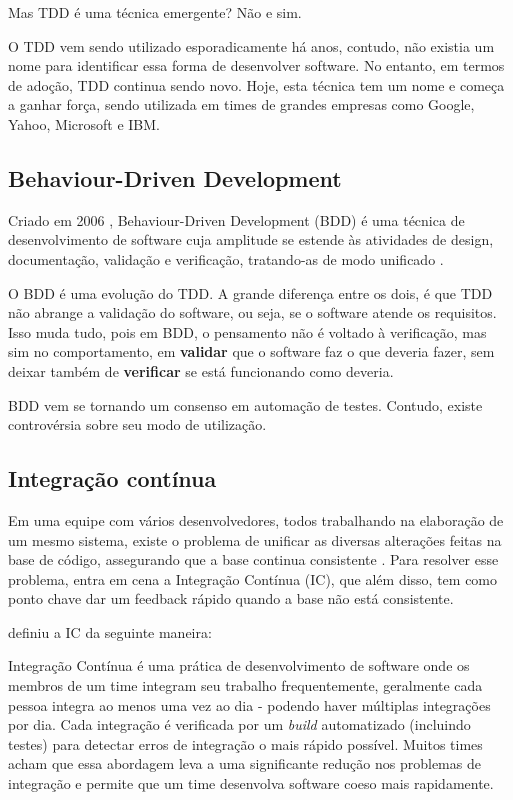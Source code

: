 Mas TDD é uma técnica emergente? Não e sim.

O TDD vem sendo utilizado esporadicamente há anos, contudo, não existia um nome
para identificar essa forma de desenvolver software. No entanto, em termos de
adoção, TDD continua sendo novo. \cite{TestDrivenKoskela, TDDbyExample, EmpiricalTDD}
Hoje, esta técnica tem um nome e começa a ganhar força, sendo utilizada em times
de grandes empresas como Google, Yahoo, Microsoft e IBM. \cite{EmpiricalTDD}



\subsection{Behaviour-Driven Development}

Criado em 2006 \cite{IntroducingBDD}, Behaviour-Driven Development (BDD) é uma
técnica de desenvolvimento de software cuja amplitude se estende às atividades
de design, documentação, validação e verificação, tratando-as de modo unificado
\cite{BDDRodrigo}.

O BDD é uma evolução do TDD. A grande diferença entre os dois, é que TDD não
abrange a validação do software, ou seja, se o software atende os requisitos.
Isso muda tudo, pois em BDD, o pensamento não é voltado à verificação, mas sim
no comportamento, em \textbf{validar} que o software faz o que deveria fazer,
sem deixar também de \textbf{verificar} se está funcionando como deveria.

BDD vem se tornando um consenso em automação de testes. Contudo, existe
controvérsia sobre seu modo de utilização.





\subsection{Integração contínua}

Em uma equipe com vários desenvolvedores, todos trabalhando na elaboração de um
mesmo sistema, existe o problema de unificar as diversas alterações feitas na
base de código, assegurando que a base continua consistente \cite{ImproveitCI}.
Para resolver esse problema, entra em cena a Integração Contínua (IC), que além
disso, tem como ponto chave dar um feedback rápido quando a base não está
consistente.

\cite{FowlerCI} definiu a IC da seguinte maneira:

\begin{citacao}
Integração Contínua é uma prática de desenvolvimento de software onde os membros
de um time integram seu trabalho frequentemente, geralmente cada pessoa integra
ao menos uma vez ao dia - podendo haver múltiplas integrações por dia. Cada
integração é verificada por um \textit{build} automatizado (incluindo testes)
para detectar erros de integração o mais rápido possível. Muitos times acham que
essa abordagem leva a uma significante redução nos problemas de integração e
permite que um time desenvolva software coeso mais rapidamente.
\end{citacao}

